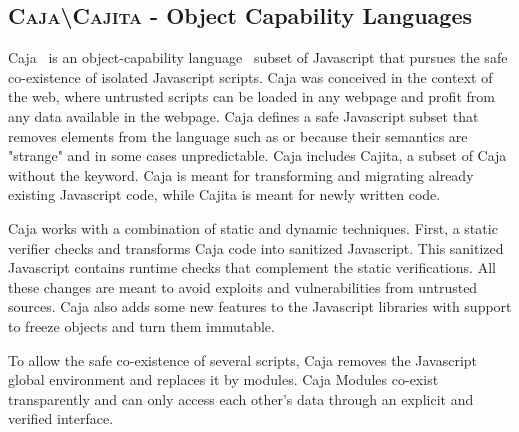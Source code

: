 \subsection*{\textsc{Caja\textbackslash Cajita} - Object Capability Languages}

Caja~\cite{Mill08a} is an object-capability language~\cite{Levy84a,Mill03a,Spoo00a} subset of Javascript that pursues the safe co-existence of isolated Javascript scripts. Caja was conceived in the context of the web, where untrusted scripts can be loaded in any webpage and profit from any data available in the webpage. Caja defines a safe Javascript subset that removes elements from the language such as  or  because their semantics are "strange" and in some cases unpredictable. Caja includes Cajita, a subset of Caja without the  keyword. Caja is meant for transforming and migrating already existing Javascript code, while Cajita is meant for newly written code.

Caja works with a combination of static and dynamic techniques. First, a static verifier checks and transforms Caja code into sanitized Javascript. This sanitized Javascript contains runtime checks that complement the static verifications. All these changes are meant to avoid exploits and vulnerabilities from untrusted sources. Caja also adds some new features to the Javascript libraries with support to freeze objects and turn them immutable. 

To allow the safe co-existence of several scripts, Caja removes the Javascript global environment and replaces it by modules. Caja Modules co-exist transparently and can only access each other's data through an explicit and verified interface.
%


